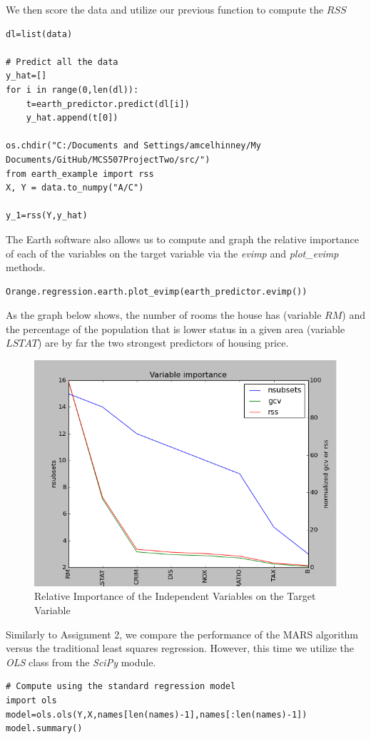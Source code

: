 We then score the data and utilize our previous function to compute the $RSS$ 
\begin{lstlisting}[caption={Compute the RSS},label=2nd,firstnumber=62]
dl=list(data)

# Predict all the data
y_hat=[]
for i in range(0,len(dl)):
    t=earth_predictor.predict(dl[i])
    y_hat.append(t[0])

os.chdir("C:/Documents and Settings/amcelhinney/My Documents/GitHub/MCS507ProjectTwo/src/")
from earth_example import rss
X, Y = data.to_numpy("A/C")

y_1=rss(Y,y_hat)
\end{lstlisting}
The Earth software also allows us to compute and graph the relative importance of each of the variables on the target variable via the \emph{evimp} and \emph{plot\_evimp} methods.
\begin{lstlisting}[caption={Load the Data and Explore},label=2nd,firstnumber=75]
Orange.regression.earth.plot_evimp(earth_predictor.evimp())
\end{lstlisting}
As the graph below shows, the number of rooms the house has (variable $RM$) and the percentage of the population that is lower status in a given area (variable $LSTAT$) are by far the two strongest predictors of housing price. 
\begin{figure}[H]
    \centering
       \includegraphics[width=4.in]{variable_importance.png}
    \caption{Relative Importance of the Independent Variables on the Target Variable}
    \label{Example Data}
\end{figure}

Similarly to Assignment 2, we compare the performance of the MARS algorithm versus the traditional least squares regression. However, this time we utilize the \emph{OLS} class from the \emph{SciPy} module. 
\begin{lstlisting}[caption={Fit the OLS Model},label=2nd,firstnumber=77]
# Compute using the standard regression model
import ols
model=ols.ols(Y,X,names[len(names)-1],names[:len(names)-1])
model.summary()
\end{lstlisting}

